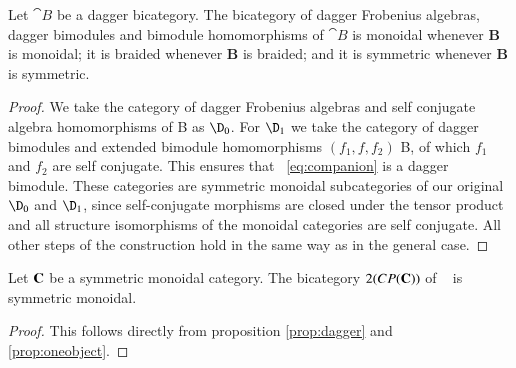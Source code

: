 \documentclass{amsart}
\begin{document}
\begin{prop}\label{prop:dagger}
Let ${\cat B}$ be a dagger bicategory. The bicategory of dagger Frobenius algebras, dagger bimodules and bimodule homomorphisms of ${\cat B}$ is monoidal whenever {\bf B} is monoidal; it is braided whenever {\bf B} is braided; and it is symmetric whenever {\bf B} is symmetric.
\end{prop}

\begin{proof}
We take the category of dagger Frobenius algebras and self conjugate algebra homomorphisms of {\cat B} as $\D_0$. For $\D_1$ we take the category of dagger bimodules and extended bimodule homomorphisms $(f_1,f,f_2)$ {\cat B}, of which $f_1$ and $f_2$ are self conjugate. This ensures that ~\ref{eq:companion} is a dagger bimodule.  These categories are symmetric monoidal subcategories of our original $\D_0$ and $\D_1$, since self-conjugate morphisms are closed under the tensor product and all structure isomorphisms of the monoidal categories are self conjugate. All other steps of the construction hold in the same way as in the general case.  
\end{proof}

\begin{cor}
Let ${\bf C}$ be a symmetric monoidal category. The bicategory $2(CP({\bf C}))$ of ~\cite{heunenvicarywester} is symmetric monoidal.
\end{cor}

\begin{proof}
This follows directly from proposition \ref{prop:dagger} and \ref{prop:oneobject}.
\end{proof}
\end{document}
